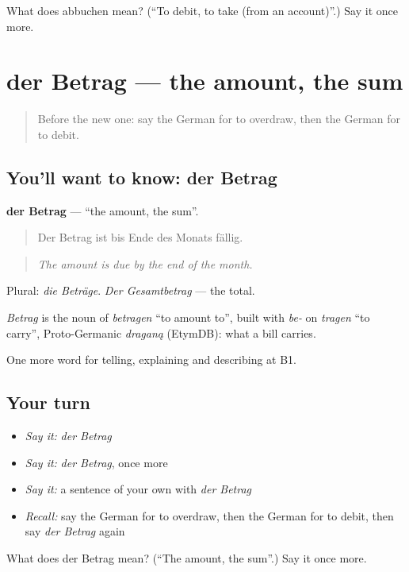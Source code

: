 \begin{tcolorbox}[breakable,colback=teal!4,colframe=teal!35!black,title={Before you move on}]
What does abbuchen mean? (\textquotedblleft{}To debit, to take (from an account)\textquotedblright{}.) Say it once more.
\end{tcolorbox}
\section[der Betrag]{der Betrag — the amount, the sum}

\label{lesson:GE-C387-betrag}



\begin{quote}
Before the new one: say the German for to overdraw, then the German for to debit.
\end{quote}

\subsection*{You'll want to know: der Betrag}
\textbf{der Betrag} — \textquotedblleft{}the amount, the sum\textquotedblright{}.

\begin{quote}
Der Betrag ist bis Ende des Monats fällig.
\end{quote}

\begin{quote}
\emph{The amount is due by the end of the month.}
\end{quote}

Plural: \emph{die Beträge}. \emph{Der Gesamtbetrag} — the total.

\begin{cousinweb}
\emph{Betrag} is the noun of \emph{betragen} \textquotedblleft{}to amount to\textquotedblright{}, built with \emph{be-} on \emph{tragen} \textquotedblleft{}to carry\textquotedblright{}, Proto-Germanic \emph{draganą} (EtymDB): what a bill carries.
\end{cousinweb}

\begin{grammarlens}[title={What you've built}]
One more word for telling, explaining and describing at B1.
\end{grammarlens}

\subsection*{Your turn}
\begin{itemize}
\raggedright
  \item \emph{Say it:} \emph{der Betrag}
  \item \emph{Say it:} \emph{der Betrag}, once more
  \item \emph{Say it:} a sentence of your own with \emph{der Betrag}
  \item \emph{Recall:} say the German for to overdraw, then the German for to debit, then say \emph{der Betrag} again
\end{itemize}

\begin{tcolorbox}[breakable,colback=teal!4,colframe=teal!35!black,title={Before you move on}]
What does der Betrag mean? (\textquotedblleft{}The amount, the sum\textquotedblright{}.) Say it once more.
\end{tcolorbox}
